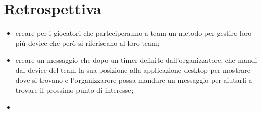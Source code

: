 \documentclass[12pt, italian]{article}
\begin{document}
\section{Retrospettiva}
\begin{itemize}
	\item creare per i giocatori che parteciperanno a team un metodo per gestire loro più device che però si riferiscano al loro team;
	\item creare un messaggio che dopo un timer definito dall'organizzatore, che mandi dal device del team la sua posizione alla applicazione desktop per mostrare dove si trovano e l'organizzarore possa mandare un messaggio per aiutarli a trovare il prossimo punto di interesse;
	\item 
\end{itemize}
\vspace{-30pt}
\end{document}
